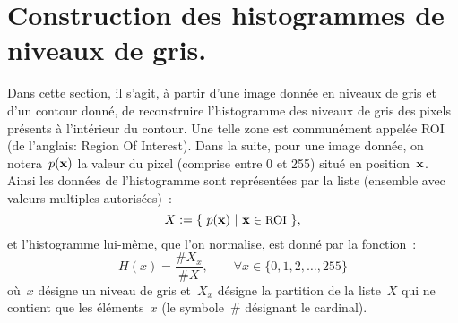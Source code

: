 \documentclass[main.tex]{subfiles}
\begin{document}
\section{Construction des histogrammes de niveaux de gris.}
Dans cette section, il s'agit, à partir d'une image donnée en niveaux de gris et d'un contour donné, de reconstruire l'histogramme des niveaux de gris des pixels présents à l'intérieur du contour. Une telle zone est communément appelée ROI (de l'anglais: Region Of Interest). Dans la suite, pour une image donnée, on notera~$p(\mathbf{x})$ la valeur du pixel (comprise entre 0 et 255) situé en position~$\mathbf{x}$. Ainsi les données de l'histogramme sont représentées par la liste (ensemble avec valeurs multiples autorisées)~:
\begin{equation}
\label{eq:def_data_histo}
X:=\{ \ p(\mathbf{x}) \  | \  \mathbf{x} \in \textrm{\small ROI} \ \},
\end{equation}
et l'histogramme lui-même, que l'on normalise, est donné par la fonction~:
\begin{equation}
\label{eq:def_histo}
H(x) = \dfrac{ \# X_x  }{ \# X }, \qquad \forall x \in \{ 0,1,2,\ldots,255 \}
\end{equation}
où~$x$ désigne un niveau de gris et~$X_x$ désigne la partition de la liste~$X$ qui ne contient que les éléments~$x$ (le symbole~$\#$ désignant le cardinal).
\end{document}
